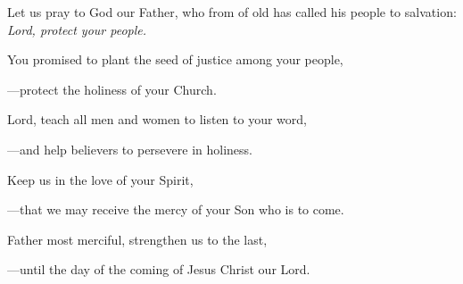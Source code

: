 \intercessions\indent

\begin{hangpar}

Let us pray to God our Father, who from of old has called his people to salvation:\\
\emph{Lord, protect your people.}

\medskip You promised to plant the seed of justice among your people,

{\color{red}---\thinspace}protect the holiness of your Church.

\medskip Lord, teach all men and women to listen to your word,

{\color{red}---\thinspace}and help believers to persevere in holiness.

\medskip Keep us in the love of your Spirit,

{\color{red}---\thinspace}that we may receive the mercy of your Son who is to come.

\medskip Father most merciful, strengthen us to the last,

{\color{red}---\thinspace}until the day of the coming of Jesus Christ our Lord.

\medskip

\end{hangpar}